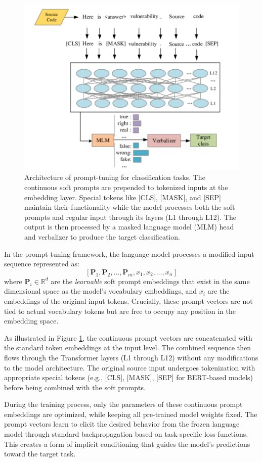 \begin{figure}[t]
\centering
\includegraphics[width=0.8\linewidth]{img/chap05/5.2.5.png}
\caption{Architecture of prompt-tuning for classification tasks. The continuous soft prompts are prepended to tokenized inputs at the embedding layer. Special tokens like [CLS], [MASK], and [SEP] maintain their functionality while the model processes both the soft prompts and regular input through its layers (L1 through L12). The output is then processed by a masked language model (MLM) head and verbalizer to produce the target classification.}
\label{fig:prompt_tuning}
\end{figure}

In the prompt-tuning framework, the language model processes a modified input sequence represented as:
\[
[\mathbf{P}_1, \mathbf{P}_2, \ldots, \mathbf{P}_m, x_1, x_2, \ldots, x_n]
\]
where \( \mathbf{P}_i \in \mathbb{R}^d \) are the \textit{learnable} soft prompt embeddings that exist in the same dimensional space as the model's vocabulary embeddings, and \( x_i \) are the embeddings of the original input tokens. Crucially, these prompt vectors are not tied to actual vocabulary tokens but are free to occupy any position in the embedding space.

As illustrated in Figure \ref{fig:prompt_tuning}, the continuous prompt vectors are concatenated with the standard token embeddings at the input level. The combined sequence then flows through the Transformer layers (L1 through L12) without any modifications to the model architecture. The original source input undergoes tokenization with appropriate special tokens (e.g., [CLS], [MASK], [SEP] for BERT-based models) before being combined with the soft prompts.

During the training process, only the parameters of these continuous prompt embeddings are optimized, while keeping all pre-trained model weights fixed. The prompt vectors learn to elicit the desired behavior from the frozen language model through standard backpropagation based on task-specific loss functions. This creates a form of implicit conditioning that guides the model's predictions toward the target task.

